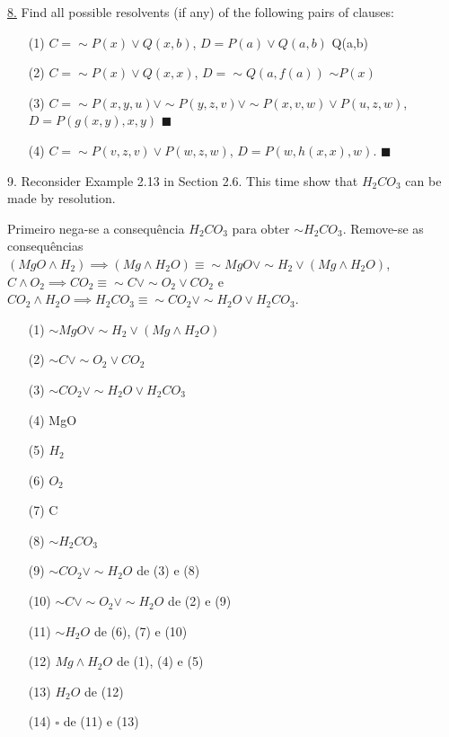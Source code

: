 \underline{8.} Find all possible resolvents (if any) of the following pairs of clauses:
\begin{itemize}
 \item[(1)] $ C = \sim P(x) \vee Q(x,b) $, $ D = P(a) \vee Q(a,b) $ \newline
Q(a,b)
 \item[(2)] $ C = \sim P(x) \vee Q(x,x) $, $ D = \sim Q (a,f(a)) $ \newline
$\sim P(x)$
 \item[(3)] $ C = \sim P(x,y,u) \vee \sim P(y,z,v) \vee \sim P(x,v,w) \vee P(u,z,w) $, $ D = P(g(x,y),x,y) $ \newline
$ \blacksquare $
 \item[(4)] $ C = \sim P(v,z,v) \vee P(w,z,w) $, $ D = P(w,h(x,x),w) $. \newline
$ \blacksquare $
\end{itemize}

9. Reconsider Example 2.13 in Section 2.6. This time show that $H_2CO_3$ can be made by resolution.

Primeiro nega-se a consequência $H_2CO_3$ para obter $ \sim H_2CO_3 $. Remove-se as consequências $ (MgO \wedge H_2) \implies (Mg \wedge H_2O) \equiv \sim MgO \vee \sim H_2 \vee (Mg \wedge H_2O)$, $ C \wedge O_2 \implies CO_2 \equiv \sim C \vee \sim O_2 \vee CO_2$ e $ CO_2 \wedge H_2O \implies H_2CO_3 \equiv \sim CO_2 \vee \sim H_2O \vee H_2CO_3$.

\begin{itemize}
 \item[(1)] $ \sim MgO \vee \sim H_2 \vee (Mg \wedge H_2O) $
 \item[(2)] $ \sim C \vee \sim O_2 \vee CO_2 $
 \item[(3)] $ \sim CO_2 \vee \sim H_2O \vee H_2CO_3 $
 \item[(4)] MgO
 \item[(5)] $ H_2 $
 \item[(6)] $ O_2 $
 \item[(7)] C
 \item[(8)] $ \sim H_2CO_3 $
 \item[(9)] $ \sim CO_2 \vee \sim H_2O $ de (3) e (8)
 \item[(10)] $ \sim C \vee \sim O_2 \vee \sim H_2O $ de (2) e (9)
 \item[(11)] $ \sim H_2O $ de (6), (7) e (10)
 \item[(12)] $ Mg \wedge H_2O $ de (1), (4) e (5)
 \item[(13)] $ H_2O $ de (12)
 \item[(14)] $ \square $ de (11) e (13)
\end{itemize}

